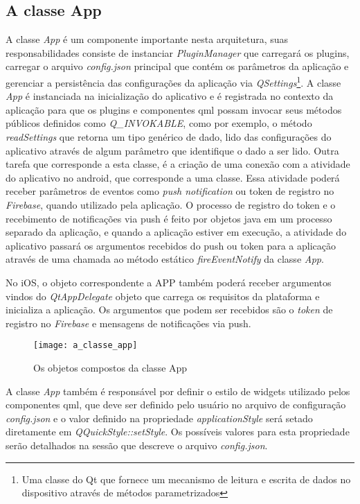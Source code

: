 \subsection{A classe App}\label{sec:solucao-desenvolvida}
A classe \textit{App} é um componente importante nesta arquitetura, suas responsabilidades consiste de instanciar \textit{PluginManager} que carregará os plugins, carregar o arquivo \textit{config.json} principal que contém os parâmetros da aplicação e gerenciar a persistência das configurações da aplicação via \textit{QSettings}\footnote{Uma classe do Qt que fornece um mecanismo de leitura e escrita de dados no dispositivo através de métodos parametrizados}. A classe \textit{App} é instanciada na inicialização do aplicativo e é registrada no contexto da aplicação para que os plugins e componentes qml possam invocar seus métodos públicos definidos como \textit{Q\_INVOKABLE}, como por exemplo, o método \textit{readSettings} que retorna um tipo genérico de dado, lido das configurações do aplicativo através de algum parâmetro que identifique o dado a ser lido. Outra tarefa que corresponde a esta classe, é a criação de uma conexão com a atividade do aplicativo no android, que corresponde a uma classe. Essa atividade poderá receber parâmetros de eventos como \textit{push notification} ou token de registro no \textit{Firebase}, quando utilizado pela aplicação. O processo de registro do token e o recebimento de notificações via push é feito por objetos java em um processo separado da aplicação, e quando a aplicação estiver em execução, a atividade do aplicativo passará os argumentos recebidos do push ou token para a aplicação através de uma chamada ao método estático \textit{fireEventNotify} da classe \textit{App}.\par

No iOS, o objeto correspondente a APP também poderá receber argumentos vindos do \textit{QtAppDelegate} objeto que carrega os requisitos da plataforma e inicializa a aplicação. Os argumentos que podem ser recebidos são o \textit{token} de registro no \textit{Firebase} e mensagens de notificações via push.

\begin{figure}[h]
	\texttt{[image: a\_classe\_app]}
	\centering
	\caption{Os objetos compostos da classe App}
\end{figure}

A classe \textit{App} também é responsável por definir o estilo de widgets utilizado pelos componentes qml, que deve ser definido pelo usuário no arquivo de configuração \textit{config.json} e o valor definido na propriedade \textit{applicationStyle} será setado diretamente em \textit{QQuickStyle::setStyle}. Os possíveis valores para esta propriedade serão detalhados na sessão que descreve o arquivo \textit{config.json}.


